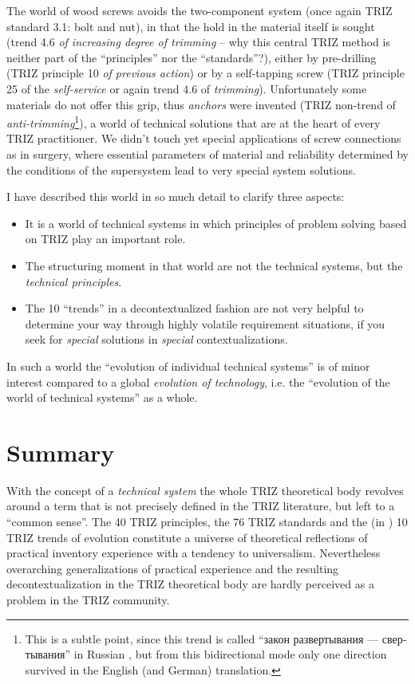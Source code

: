 \documentclass[11pt,a4paper]{article}
\begin{document}
The world of wood screws avoids the two-component system (once again TRIZ
standard 3.1: bolt and nut), in that the hold in the material itself is sought
(trend 4.6 \emph{of increasing degree of trimming} -- why this central TRIZ
method is neither part of the ``principles'' nor the ``standards''?), either
by pre-drilling (TRIZ principle 10 \emph{of previous action}) or by a
self-tapping screw (TRIZ principle 25 of the \emph{self-service} or again
trend 4.6 of \emph{trimming}). Unfortunately some materials do not offer this
grip, thus \emph{anchors} were invented (TRIZ non-trend of
\emph{anti-trimming}\footnote{This is a subtle point, since this trend is
  called ``\foreignlanguage{russian}{закон развертывания — свертывания}'' in
  Russian \cite[2.1.6]{TBK-2007}, but from this bidirectional mode only one
  direction survived in the English (and German) translation.}), a world of
technical solutions that are at the heart of every TRIZ practitioner.  We
didn't touch yet special applications of screw connections as in surgery,
where essential parameters of material and reliability determined by the
conditions of the supersystem lead to very special system solutions.

I have described this world in so much detail to clarify three aspects:
\begin{itemize}[noitemsep]
\item [1)] It is a world of technical systems in which principles of problem
  solving based on TRIZ play an important role.
\item [2)] The structuring moment in that world are not the technical systems,
  but the \emph{technical principles}.
\item [3)] The 10 ``trends'' in a decontextualized fashion are not very
  helpful to determine your way through highly volatile requirement
  situations, if you seek for \emph{special} solutions in \emph{special}
  contextualizations.
\end{itemize}
In such a world the ``evolution of individual technical systems'' is of minor
interest compared to a global \emph{evolution of technology}, i.e. the
``evolution of the world of technical systems'' as a whole.

\section{Summary}

With the concept of a \emph{technical system} the whole TRIZ theoretical body
revolves around a term that is not precisely defined in the TRIZ literature,
but left to a ``common sense''. The 40 TRIZ principles, the 76 TRIZ standards
and the (in \cite{TESE2018}) 10 TRIZ trends of evolution constitute a universe
of theoretical reflections of practical inventory experience with a tendency
to universalism.  Nevertheless overarching generalizations of practical
experience and the resulting decontextualization in the TRIZ theoretical body
are hardly perceived as a problem in the TRIZ community.
\end{document}
